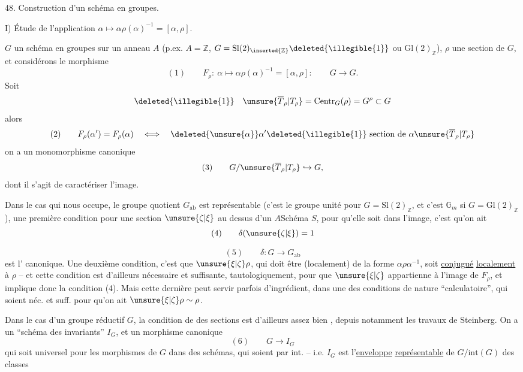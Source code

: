 
48. Construction d'un schéma en groupes.

I) Étude de l'application $\alpha\longmapsto
\alpha\rho(\alpha)^{-1}=[\alpha,\rho]$.

 $G$ un schéma en groupes sur un anneau
$A$ (p.ex. $A=\mathbb Z$, $G=\mathrm{Sl}(2)_{\inserted{\mathbb Z}}
\deleted{\illegible{1}}$ ou $\mathrm{Gl}(2)_{\mathbb Z}$),
$\rho$ une section de $G$, et considérons le morphisme
\[
(1)\qquad
F_\rho:\ \alpha\longmapsto\alpha\rho(\alpha)^{-1}
=[\alpha,\rho]:\qquad G\longrightarrow G.
\]
Soit
\[
\deleted{\illegible{1}}\quad
\unsure{\overline T_\rho|T_\rho}
=\mathrm{Centr}_G(\rho)=G^\rho\subset G
\]
alors
\[
(2)\qquad
F_\rho(\alpha')=F_\rho(\alpha)\quad\Longleftrightarrow\quad
\deleted{\unsure{\alpha}}\alpha'\deleted{\illegible{1}}
\text{ section de }\alpha\unsure{\overline T_\rho|T_\rho}
\]
 on a un monomorphisme canonique
\[
(3)\qquad
G/\unsure{\overline T_\rho|T_\rho}\hookrightarrow G,
\]
dont il s'agit de caractériser l'image.

Dans le cas qui nous occupe, le groupe quotient $G_{\mathrm{ab}}$
est représentable (c'est le groupe unité pour
$G=\mathrm{Sl}(2)_{\mathbb Z}$, et c'est $\mathbb G_m$ si
$G=\mathrm{Gl}(2)_{\mathbb Z}$),
 une première condition pour
une section $\unsure{\zeta|\xi}$
au dessus d'un $A$Schéma $S$,  pour qu'elle
soit dans l'image, c'est qu'on ait
\[
(4)\qquad\delta(\unsure{\zeta|\xi})=1
\]

\[
(5)\qquad \delta:G\longrightarrow G_{\mathrm{ab}}
\]
est l' canonique. Une deuxième condition, c'est que $\unsure{\xi|\zeta}\rho$, qui doit être (localement) de la forme $\alpha\rho\alpha^{-1}$, soit \uline{conjugué} \uline{localement} à $\rho$ -- et cette condition est d'ailleurs nécessaire et suffisante, tautologiquement, pour que $\unsure{\xi|\zeta}$ appartienne à l'image de $F_\rho$, et implique donc la condition (4). Mais cette dernière peut servir parfois d'ingrédient,  dans une  des conditions de nature ``calculatoire'', qui soient néc. et suff. pour qu'on ait $\unsure{\xi|\zeta}\rho\sim\rho$.

Dans le cas d'un groupe réductif $G$, la condition de   des sections est d'ailleurs assez bien , depuis notamment les travaux de Steinberg. On a un ``schéma des invariants'' $I_G$, et un morphisme canonique
\[
(6)\qquad G\longrightarrow I_G
\]
\unsure{(}qui soit universel  pour les morphismes de $G$ dans des schémas, qui soient  par  int. -- i.e. $I_G$ est l'\uline{enveloppe} \uline{représentable} de $G/\mathrm{int}(G)$  des classes

